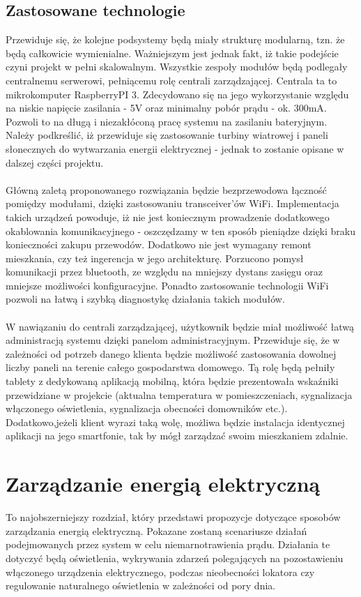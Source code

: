 \documentclass[12pt]{article} %
\begin{document}
\subsection{Zastosowane technologie}
Przewiduje się, że kolejne podsystemy będą miały strukturę modularną, tzn. że będą całkowicie wymienialne. Ważniejszym jest jednak fakt, iż takie podejście czyni projekt w pełni skalowalnym. Wszystkie zespoły modułów będą podlegały centralnemu serwerowi, pełniącemu rolę centrali zarządzającej. Centrala ta to mikrokomputer RaspberryPI 3. Zdecydowano się na jego wykorzystanie względu na niskie napięcie zasilania - 5V oraz minimalny pobór prądu - ok. 300mA. Pozwoli to na długą i niezakłóconą pracę systemu na zasilaniu bateryjnym. Należy podkreślić, iż przewiduje się zastosowanie turbiny wiatrowej i paneli słonecznych do wytwarzania energii elektrycznej - jednak to zostanie opisane w dalszej części projektu.
\\ \\
Główną zaletą proponowanego rozwiązania będzie bezprzewodowa łączność pomiędzy modułami, dzięki zastosowaniu transceiver'ów WiFi. Implementacja takich urządzeń powoduje, iż nie jest koniecznym prowadzenie dodatkowego okablowania komunikacyjnego - oszczędzamy w ten sposób pieniądze dzięki braku konieczności zakupu przewodów. Dodatkowo nie jest wymagany remont mieszkania, czy też ingerencja w jego architekturę. Porzucono pomysł komunikacji przez bluetooth, ze względu na mniejszy dystans zasięgu oraz mniejsze możliwości konfiguracyjne.
Ponadto zastosowanie technologii WiFi pozwoli na łatwą i szybką diagnostykę działania takich modułów.
\\ \\ 
W nawiązaniu do centrali zarządzającej, użytkownik będzie miał możliwość łatwą administracją systemu dzięki panelom administracyjnym. Przewiduje się, że w zależności od potrzeb danego klienta będzie możliwość zastosowania dowolnej liczby paneli na terenie całego gospodarstwa domowego. Tą rolę będą pełniły tablety z dedykowaną aplikacją mobilną, która będzie prezentowała wskaźniki przewidziane w projekcie (aktualna temperatura w pomieszczeniach, sygnalizacja włączonego oświetlenia, sygnalizacja obecności domowników etc.). Dodatkowo,jeżeli klient wyrazi taką wolę, możliwa będzie instalacja identycznej aplikacji na jego smartfonie, tak by mógł zarządzać swoim mieszkaniem zdalnie.



\section{Zarządzanie energią elektryczną}
To najobszerniejszy rozdział, który przedstawi propozycje dotyczące sposobów zarządzania energią elektryczną. Pokazane zostaną scenariusze działań podejmowanych przez system w celu niemarnotrawienia prądu. Działania te dotyczyć będą oświetlenia, wykrywania zdarzeń polegających na pozostawieniu   włączonego urządzenia elektrycznego, podczas nieobecności lokatora czy regulowanie naturalnego oświetlenia w zależności od pory dnia.
\end{document}
